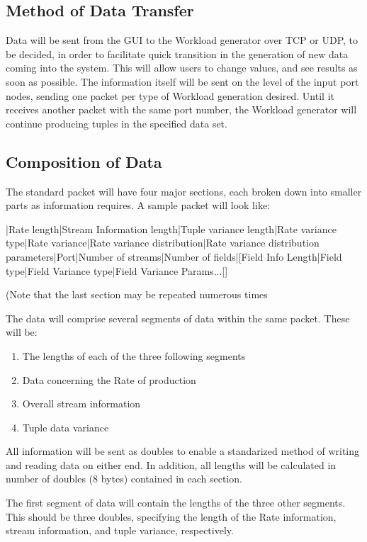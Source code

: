 \documentclass[a4paper,12pt]{article}
\begin{document}
\subsection*{Method of Data Transfer}

Data will be sent from the GUI to the Workload generator over TCP or UDP, to be
decided, in order to facilitate quick transition in the generation of new data
coming into the system. This will allow users to change values, and see results
as soon as possible. The information itself will be sent on the level of the
input port nodes, sending one packet per type of Workload generation desired.
Until it receives another packet with the same port number, the Workload
generator will continue producing tuples in the specified data set.

\subsection*{Composition of Data}

The standard packet will have four major sections, each broken down into smaller
parts as information requires. A sample packet will look like:

|Rate length|Stream Information length|Tuple variance length|Rate variance
type|Rate variance|Rate variance distribution|Rate variance distribution 
parameters|Port|Number of streams|Number of fields|[Field Info Length|Field 
type|Field Variance type|Field Variance Params...|]

(Note that the last section may be repeated numerous times

The data will comprise several segments of data within the same packet. These
will be:

\begin{enumerate}
\item The lengths of each of the three following segments
\item Data concerning the Rate of production
\item Overall stream information
\item Tuple data variance
\end{enumerate}

All information will be sent as doubles to enable a standarized method of
writing and reading data on either end. In addition, all lengths will be
calculated in number of doubles (8 bytes) contained in each section.

The first segment of data will contain the lengths of the three other segments.
This should be three doubles, specifying the length of the Rate information,
stream information, and tuple variance, respectively.
\end{document}
